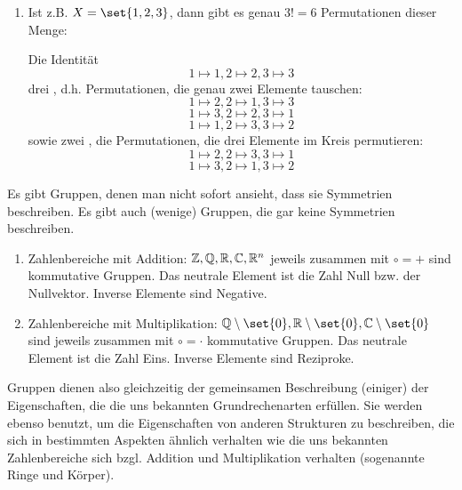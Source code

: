 \begin{example}[Symmetriegruppen]
\begin{enumerate}
\item Ist z.B. $X=\set{1,2,3}$, dann gibt es genau $3!=6$ Permutationen dieser Menge:

Die Identität
\[1\mapsto 1, 2\mapsto 2, 3\mapsto 3\]
drei , d.h. Permutationen, die genau zwei Elemente tauschen:
\[1\mapsto 2, 2\mapsto 1, 3\mapsto 3\]
\[1\mapsto 3, 2\mapsto 2, 3\mapsto 1\]
\[1\mapsto 1, 2\mapsto 3, 3\mapsto 2\]
sowie zwei , die Permutationen, die drei Elemente im Kreis permutieren:
\[1\mapsto 2, 2\mapsto 3, 3\mapsto 1\]
\[1\mapsto 3, 2\mapsto 1, 3\mapsto 2\]
\end{enumerate}
\end{example}

\begin{example}
Es gibt Gruppen, denen man nicht sofort ansieht, dass sie Symmetrien beschreiben. Es gibt auch (wenige) Gruppen, die gar keine Symmetrien beschreiben.

\begin{enumerate}
\item Zahlenbereiche mit Addition: $\mathbb{Z},\mathbb{Q},\mathbb{R},\mathbb{C},\mathbb{R}^n$ jeweils zusammen mit $\circ=+$ sind kommutative Gruppen. Das neutrale Element ist die Zahl Null bzw. der Nullvektor. Inverse Elemente sind Negative.
\item Zahlenbereiche mit Multiplikation: $\IQ\setminus\set{0},\IR\setminus\set{0},\IC\setminus\set{0}$ sind jeweils zusammen mit $\circ=\cdot$ kommutative Gruppen. Das neutrale Element ist die Zahl Eins. Inverse Elemente sind Reziproke.
\end{enumerate}

Gruppen dienen also gleichzeitig der gemeinsamen Beschreibung (einiger) der Eigenschaften, die die uns bekannten Grundrechenarten erfüllen. Sie werden ebenso benutzt, um die Eigenschaften von anderen Strukturen zu beschreiben, die sich in bestimmten Aspekten ähnlich verhalten wie die uns bekannten Zahlenbereiche sich bzgl. Addition und Multiplikation verhalten (sogenannte Ringe und Körper).
\end{example}

